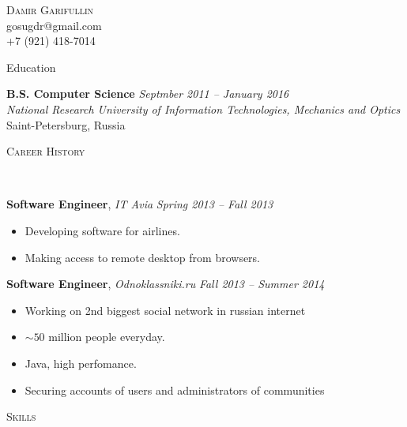 \documentclass[12pt]{article}
\newenvironment{changemargin}[2]{%
  \begin{list}{}{%
    \setlength{\topsep}{0pt}%
    \setlength{\leftmargin}{#1}%
    \setlength{\rightmargin}{#2}%
    \setlength{\listparindent}{\parindent}%
    \setlength{\itemindent}{\parindent}%
    \setlength{\parsep}{\parskip}%
  }%
  \item[]}{\end{list}
}
\newcommand{\lineover}{
	\begin{changemargin}{-0.05in}{-0.05in}
		\vspace*{-8pt}
		\hrulefill \\
		\vspace*{-2pt}
	\end{changemargin}
}
\newcommand{\header}[1]{
	\begin{changemargin}{-0.5in}{-0.5in}
		\scshape{#1}\\
  	\lineover
	\end{changemargin}
}
\newcommand{\contact}[4]{
	\begin{changemargin}{-0.5in}{-0.5in}
		\begin{center}
			{\Large \scshape {#1}}\\ \smallskip
			{#2}\\ \smallskip 
			{#3}\\ \smallskip
			{#4}\smallskip
		\end{center}
	\end{changemargin}
}
\newenvironment{body} {
	\vspace*{-16pt}
	\begin{changemargin}{-0.25in}{-0.5in}
  }	
	{\end{changemargin}
}
\begin{document}
\contact{Damir Garifullin}{gosugdr@gmail.com}{+7 (921) 418-7014}

\header{Education}

\begin{body}
	\vspace{14pt}
	\textbf{B.S. Computer Science} \hfill \emph{Septmber 2011 -- January 2016} \\
	\smallskip
	\emph{National Research University of Information Technologies, Mechanics and Optics} Saint-Petersburg, Russia\\
\end{body}

\smallskip


\header{Career History}

\begin{body}
	\vspace{14pt}
	\textbf{Software Engineer}, \emph{IT Avia} \hfill \emph{Spring 2013 -- Fall 2013}\\
	\vspace*{-4pt}
	\begin{itemize} \itemsep -0pt  %
		\item Developing software for airlines.
		\item Making access to remote desktop from browsers.
	\end{itemize}
	\smallskip
	\vspace{14pt}
	\textbf{Software Engineer}, \emph{Odnoklassniki.ru} \hfill \emph{Fall 2013 -- Summer 2014}\\
	\vspace*{-4pt}
	\begin{itemize} \itemsep -0pt  %
		\item Working on 2nd biggest social network in russian internet
		\item $\sim50$ million people everyday.
		\item Java, high perfomance.
		\item Securing accounts of users and administrators of communities
	\end{itemize}
\end{body}

\smallskip


\header{Skills}
\end{document}
